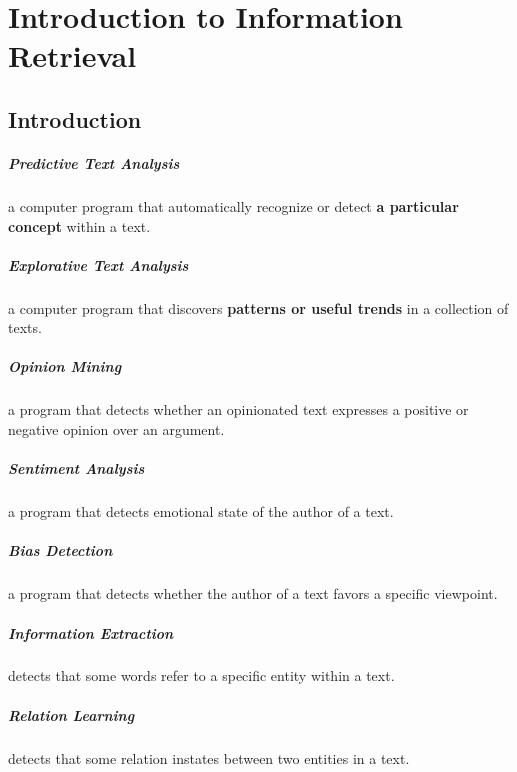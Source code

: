 \chapter{Introduction to Information Retrieval}

\section{Introduction}

\paragraph{Predictive Text Analysis} a computer program that automatically recognize or detect \textbf{a particular concept} within a text.

\paragraph{Explorative Text Analysis} a computer program that discovers \textbf{patterns or useful trends} in a collection of texts.

\paragraph{Opinion Mining} a program that detects whether an opinionated text expresses a positive or negative opinion over an argument.

\paragraph{Sentiment Analysis} a program that detects emotional state of the author of a text.

\paragraph{Bias Detection} a program that detects whether the author of a text favors a specific viewpoint.

\paragraph{Information Extraction} detects that some words refer to a specific entity within a text.

\paragraph{Relation Learning} detects that some relation instates between two entities in a text.

